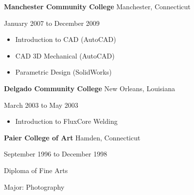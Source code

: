 \documentclass[9pt]{extarticle}
\begin{document}
\textbf{Manchester Community College} \hfill Manchester, Connecticut

January 2007 to December 2009

\begin{multicols}{2}
\begin{itemize}
    \item Introduction to CAD (AutoCAD) 
    \item CAD 3D Mechanical (AutoCAD)
        \columnbreak
    \item Parametric Design (SolidWorks)
    \end{itemize}
\end{multicols}

\textbf{Delgado Community College} \hfill New Orleans, Louisiana

March 2003 to May 2003
\begin{itemize}
    \item Introduction to Flux­Core Welding
\end{itemize}

\textbf{Paier College of Art}  \hfill Hamden, Connecticut

September 1996 to December 1998  

Diploma of Fine Arts 

Major: Photography
\end{document}

